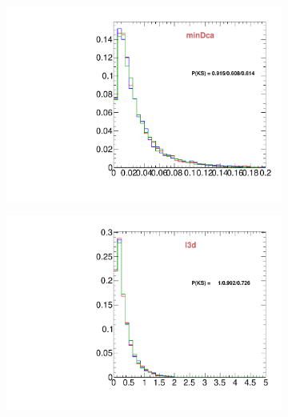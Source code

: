 \begin{figure}
\begin{subfigure}[b]{0.2\textwidth}
                \includegraphics[width=\textwidth]{Figures/VariablesComparison/MC_endcaps_figs_3h/minDca}
                \label{fig:MC_endcaps_minDca_3h}
        \end{subfigure}
        \begin{subfigure}[b]{0.2\textwidth}
                \centering
                \includegraphics[width=\textwidth]{Figures/VariablesComparison/MC_endcaps_figs_3h/l3d}
                \label{fig:MC_endcaps_l3d_3h}
        \end{subfigure}
        \begin{subfigure}[b]{0.2\textwidth}
                \centering

\end{subfigure}
\end{figure}
